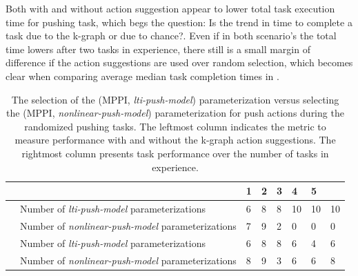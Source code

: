 Both with and without action suggestion appear to lower total task execution time for pushing task, which begs the question: Is the trend in time to complete a task due to the \ac{k-graph} or due to chance?. Even if in both scenario's the total time lowers after two tasks in experience, there still is a small margin of difference if the action suggestions are used over random selection, which becomes clear when comparing average median task completion times in .

\begin{table}[H]
    \caption{The selection of the (\ac{MPPI}, \textit{lti-push-model}) parameterization versus selecting the (\ac{MPPI}, \textit{nonlinear-push-model}) parameterization for push actions during the randomized pushing tasks. The leftmost column indicates the metric to measure performance  with and without the \ac{k-graph} action suggestions. The rightmost column presents task performance over the number of tasks in experience.}
    \label{table:rand_push_model1_vs_model2}
    \centering
    \begin{tabular}%
      {
        >{\raggedright\arraybackslash}p{}
        >{\raggedright\arraybackslash}p{}
      |p{0.4cm}p{0.4cm}p{0.4cm}p{0.4cm}p{0.4cm}p{0.4cm}}
      \multicolumn{2}{c|}{Number of Tasks in experience} &0&1&2&3&4&5\\\toprule
      \multirow{2}{0.1\textwidth}{With \ac{k-graph} suggestions} 
      &Number of \textit{lti-push-model} parameterizations&6&8&8&10&10&10\\
      &Number of \textit{nonlinear-push-model} parameterizations&7&9&2&0&0&0\\\hline
      \multirow{2}{0.1\textwidth}{Without \ac{k-graph} suggestions} 
      &Number of \textit{lti-push-model} parameterizations&6&8&8&6&4&6\\
      &Number of \textit{nonlinear-push-model} parameterizations&8&9&3&6&6&8\\
    \end{tabular}
\end{table}


